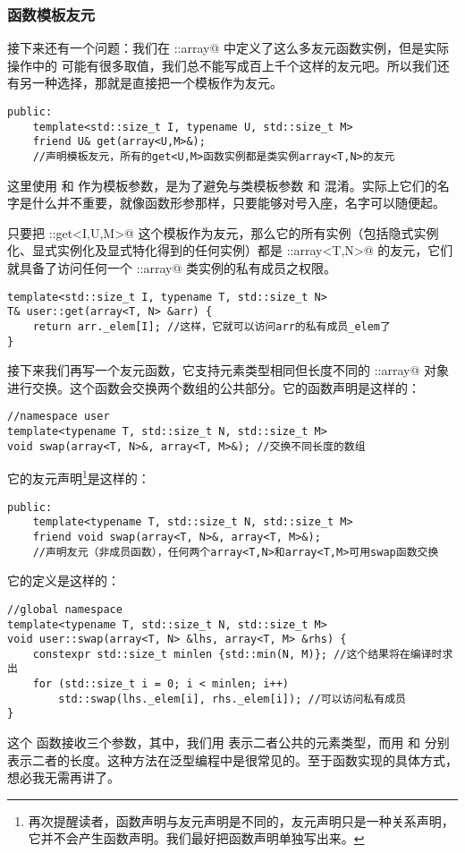 \subsubsection*{函数模板友元}
接下来还有一个问题：我们在 \lstinline@user::array@ 中定义了这么多友元函数实例，但是实际操作中的 \lstinline@I@ 可能有很多取值，我们总不能写成百上千个这样的友元吧。所以我们还有另一种选择，那就是直接把一个模板作为友元。
\begin{lstlisting}
public:
    template<std::size_t I, typename U, std::size_t M>
    friend U& get(array<U,M>&);
    //声明模板友元，所有的get<U,M>函数实例都是类实例array<T,N>的友元
\end{lstlisting}
这里使用 \lstinline@U@ 和 \lstinline@M@ 作为模板参数，是为了避免与类模板参数 \lstinline@T@ 和 \lstinline@N@ 混淆。实际上它们的名字是什么并不重要，就像函数形参那样，只要能够对号入座，名字可以随便起。\par
只要把 \lstinline@user::get<I,U,M>@ 这个模板作为友元，那么它的所有实例（包括隐式实例化、显式实例化及显式特化得到的任何实例）都是 \lstinline@user::array<T,N>@ 的友元，它们就具备了访问任何一个 \lstinline@user::array@ 类实例的私有成员之权限。
\begin{lstlisting}
template<std::size_t I, typename T, std::size_t N>
T& user::get(array<T, N> &arr) {
    return arr._elem[I]; //这样，它就可以访问arr的私有成员_elem了
}
\end{lstlisting}\par
接下来我们再写一个友元函数，它支持元素类型相同但长度不同的 \lstinline@user::array@ 对象进行交换。这个函数会交换两个数组的公共部分。它的函数声明是这样的：
\begin{lstlisting}
//namespace user
template<typename T, std::size_t N, std::size_t M>
void swap(array<T, N>&, array<T, M>&); //交换不同长度的数组
\end{lstlisting}
它的友元声明\footnote{再次提醒读者，函数声明与友元声明是不同的，友元声明只是一种关系声明，它并不会产生函数声明。我们最好把函数声明单独写出来。}是这样的：
\begin{lstlisting}
public:
    template<typename T, std::size_t N, std::size_t M>
    friend void swap(array<T, N>&, array<T, M>&);
    //声明友元（非成员函数），任何两个array<T,N>和array<T,M>可用swap函数交换
\end{lstlisting}
它的定义是这样的：
\begin{lstlisting}
//global namespace
template<typename T, std::size_t N, std::size_t M>
void user::swap(array<T, N> &lhs, array<T, M> &rhs) {
    constexpr std::size_t minlen {std::min(N, M)}; //这个结果将在编译时求出
    for (std::size_t i = 0; i < minlen; i++)
        std::swap(lhs._elem[i], rhs._elem[i]); //可以访问私有成员
}
\end{lstlisting}
这个 \lstinline@swap@ 函数接收三个参数，其中，我们用 \lstinline@T@ 表示二者公共的元素类型，而用 \lstinline@N@ 和 \lstinline@M@ 分别表示二者的长度。这种方法在泛型编程中是很常见的。至于函数实现的具体方式，想必我无需再讲了。\par
